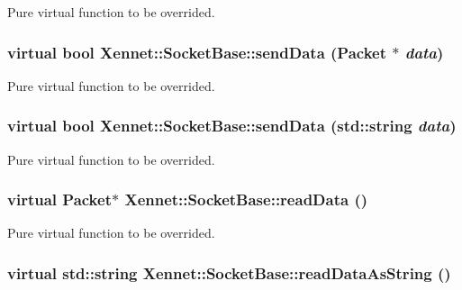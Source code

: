 Pure virtual function to be overrided. 

\hypertarget{classXennet_1_1SocketBase_1ca81fd73ba913d610c486b346711592}{
\subsubsection{\setlength{\rightskip}{0pt plus 5cm}virtual bool Xennet::SocketBase::sendData (Packet $\ast$ {\em data})}}
\label{classXennet_1_1SocketBase_1ca81fd73ba913d610c486b346711592}


Pure virtual function to be overrided. 

\hypertarget{classXennet_1_1SocketBase_1356c72d00e8a08013783a791c66f226}{
\subsubsection{\setlength{\rightskip}{0pt plus 5cm}virtual bool Xennet::SocketBase::sendData (std::string {\em data})}}
\label{classXennet_1_1SocketBase_1356c72d00e8a08013783a791c66f226}


Pure virtual function to be overrided. 

\hypertarget{classXennet_1_1SocketBase_1c3b53d1262bc49ce8232d2b1851ff14}{
\subsubsection{\setlength{\rightskip}{0pt plus 5cm}virtual Packet$\ast$ Xennet::SocketBase::readData ()}}
\label{classXennet_1_1SocketBase_1c3b53d1262bc49ce8232d2b1851ff14}


Pure virtual function to be overrided. 

\hypertarget{classXennet_1_1SocketBase_9031aea2aaccf7623827847e6e991fc0}{
\subsubsection{\setlength{\rightskip}{0pt plus 5cm}virtual std::string Xennet::SocketBase::readDataAsString ()}}
\label{classXennet_1_1SocketBase_9031aea2aaccf7623827847e6e991fc0}


